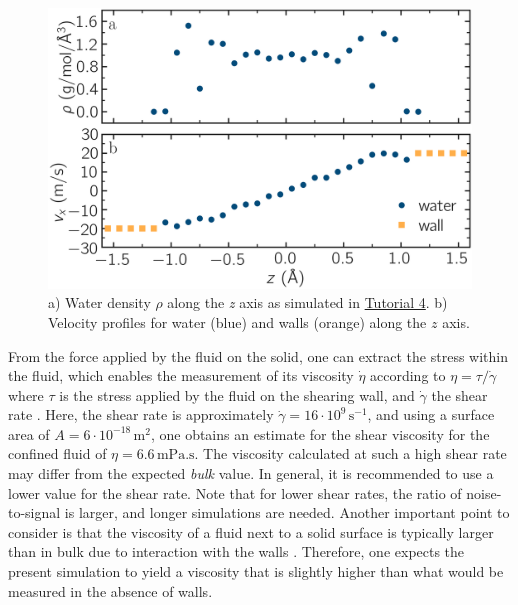 \documentclass[9pt,tutorial]{livecoms}
\begin{document}
\begin{figure}
\centering
\includegraphics[width=\linewidth]{NANOSHEAR-profiles}
\caption{a) Water density $\rho$ along the \textit{z} axis as
simulated in \hyperref[sheared-confined-label]{Tutorial 4}.
b) Velocity profiles for water (blue) and walls
(orange) along the $z$ axis.}
\label{fig:NANOSHEAR-profiles}
\end{figure}

From the force applied by the fluid on the solid, one can extract the stress
within the fluid, which enables the measurement of its viscosity $\dot{\eta}$
according to $\eta = \tau / \dot{\gamma}$ where $\tau$ is the stress applied by
the fluid on the shearing wall, and $\dot{\gamma}$ the shear rate
\cite{gravelle2021violations}.  Here, the shear rate is
approximately $\dot{\gamma} = 16 \cdot 10^9\,\text{s}^{-1}$, and using a
surface area of $A = 6 \cdot 10^{-18}\,\text{m}^2$, one obtains an estimate for
the shear viscosity for the confined fluid of $\eta = 6.6\,\text{mPa.s}$.  The
viscosity calculated at such a high shear rate may differ from the expected
\emph{bulk} value.  In general, it is recommended to use a lower value for the
shear rate.  Note that for lower shear rates, the ratio of noise-to-signal is
larger, and longer simulations are needed.  Another important point to consider
is that the viscosity of a fluid next to a solid surface is typically larger
than in bulk due to interaction with the walls \cite{wolde-kidanInterplayInterfacialViscosity2021}.
Therefore, one expects the present simulation to yield a viscosity that is slightly
higher than what would be measured in the absence of walls.
\end{document}
